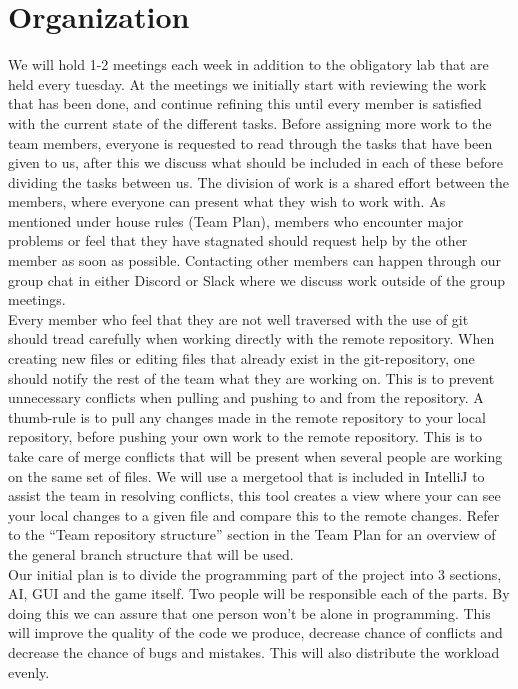 \documentclass{article}
\begin{document}
    \section{Organization}
    \noindent
    We will hold 1-2 meetings each week in addition to the obligatory lab that are held every tuesday. At the meetings we initially start with reviewing the work that has been done, and continue refining this until every member is satisfied with the current state of the different tasks. Before assigning more work to the team members, everyone is requested to read through the tasks that have been given to us, after this we discuss what should be included in each of these before dividing the tasks between us. The division of work is a shared effort between the members, where everyone can present what they wish to work with. As mentioned under house rules (Team Plan), members who encounter major problems or feel that they have stagnated should request help by the other member as soon as possible. Contacting other members can happen through our group chat in either Discord or Slack where we discuss work outside of the group meetings. \\

    \noindent
    Every member who feel that they are not well traversed with the use of git should tread carefully when working directly with the remote repository. When creating new files or editing files that already exist in the git-repository, one should notify the rest of the team what they are working on. This is to prevent unnecessary conflicts when pulling and pushing to and from the repository. A thumb-rule is to pull any changes made in the remote repository to your local repository, before pushing your own work to the remote repository. This is to take care of merge conflicts that will be present when several people are working on the same set of files. We will use a mergetool that is included in IntelliJ to assist the team in resolving conflicts, this tool creates a view where your can see your local changes to a given file and compare this to the remote changes. Refer to the “Team repository structure” section in the Team Plan for an overview of the general branch structure that will be used. \\

    \noindent
    Our initial plan is to divide the programming part of the project into 3 sections, AI, GUI and the game itself. Two people will be responsible each of the parts. By doing this we can assure that one person won’t be alone in programming. This will improve the quality of the code we produce, decrease chance of conflicts and decrease the chance of bugs and mistakes. This will also distribute the workload evenly. \\
\end{document}
